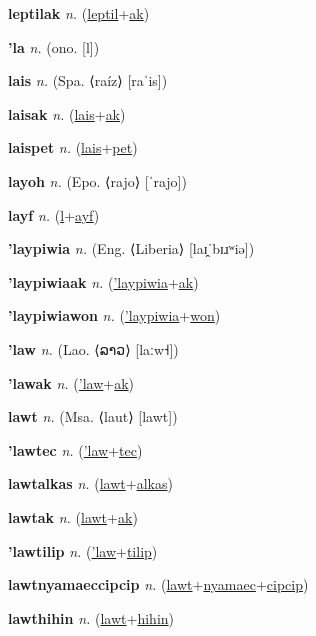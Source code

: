 \textbf{\hypertarget{leptilak}{leptilak}} \textit{n.} (\hyperlink{leptil}{leptil}+\allowbreak \hyperlink{ak}{ak})


\textbf{\hypertarget{'la}{'la}} \textit{n.} (ono. [l])


\textbf{\hypertarget{lais}{lais}} \textit{n.} (Spa. ⟨raíz⟩ [raˈis])


\textbf{\hypertarget{laisak}{laisak}} \textit{n.} (\hyperlink{lais}{lais}+\allowbreak \hyperlink{ak}{ak})


\textbf{\hypertarget{laispet}{laispet}} \textit{n.} (\hyperlink{lais}{lais}+\allowbreak \hyperlink{pet}{pet})


\textbf{\hypertarget{layoh}{layoh}} \textit{n.} (Epo. ⟨rajo⟩ [ˈrajo])


\textbf{\hypertarget{layf}{layf}} \textit{n.} (\hyperlink{l}{l}+\allowbreak \hyperlink{ayf}{ayf})


\textbf{\hypertarget{'laypiwia}{'laypiwia}} \textit{n.} (Eng. ⟨Liberia⟩ [laɪ̯ˈbɪɹʷiə])


\textbf{\hypertarget{'laypiwiaak}{'laypiwiaak}} \textit{n.} (\hyperlink{'laypiwia}{'laypiwia}+\allowbreak \hyperlink{ak}{ak})


\textbf{\hypertarget{'laypiwiawon}{'laypiwiawon}} \textit{n.} (\hyperlink{'laypiwia}{'laypiwia}+\allowbreak \hyperlink{won}{won})


\textbf{\hypertarget{'law}{'law}} \textit{n.} (Lao. ⟨{\lao{}ລາວ}⟩ [laːw˧])


\textbf{\hypertarget{'lawak}{'lawak}} \textit{n.} (\hyperlink{'law}{'law}+\allowbreak \hyperlink{ak}{ak})


\textbf{\hypertarget{lawt}{lawt}} \textit{n.} (Msa. ⟨laut⟩ [lawt])


\textbf{\hypertarget{'lawtec}{'lawtec}} \textit{n.} (\hyperlink{'law}{'law}+\allowbreak \hyperlink{tec}{tec})


\textbf{\hypertarget{lawtalkas}{lawtalkas}} \textit{n.} (\hyperlink{lawt}{lawt}+\allowbreak \hyperlink{alkas}{alkas})


\textbf{\hypertarget{lawtak}{lawtak}} \textit{n.} (\hyperlink{lawt}{lawt}+\allowbreak \hyperlink{ak}{ak})


\textbf{\hypertarget{'lawtilip}{'lawtilip}} \textit{n.} (\hyperlink{'law}{'law}+\allowbreak \hyperlink{tilip}{tilip})


\textbf{\hypertarget{lawtnyamaeccipcip}{lawtnyamaeccipcip}} \textit{n.} (\hyperlink{lawt}{lawt}+\allowbreak \hyperlink{nyamaec}{nyamaec}+\allowbreak \hyperlink{cipcip}{cipcip})


\textbf{\hypertarget{lawthihin}{lawthihin}} \textit{n.} (\hyperlink{lawt}{lawt}+\allowbreak \hyperlink{hihin}{hihin})


